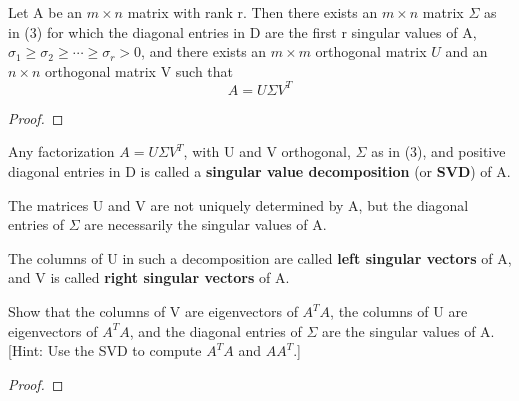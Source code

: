 \begin{theorem}
    Let A be an \(m \times n\) matrix with rank r. 
    Then there exists an \(m \times n\) matrix \(\Sigma\) as in (3) for which the diagonal entries in D are the first r singular values of A, \(\sigma_1 \geq \sigma_2 \geq \cdots \geq \sigma_r > 0\), 
    and there exists an \(m \times m\) orthogonal matrix \(U\) and an \(n \times n\) orthogonal matrix V such that
    \[
        A = U \Sigma V^T
    \]      
\end{theorem}
\begin{proof}
\end{proof}

\begin{definition}
    Any factorization \(A = U\Sigma V^T\), with U and V orthogonal, \(\Sigma \) as in (3), and positive diagonal entries in D is called a \textbf{singular value decomposition} (or \textbf{SVD}) of A. 
\end{definition}

The matrices U and V are not uniquely determined by A, but the diagonal entries of \(\Sigma\) are necessarily the singular values of A. 

The columns of U in such a decomposition are called \textbf{left singular vectors} of A, and V is called \textbf{right singular vectors} of A. 

\begin{problem}
    Show that the columns of V are eigenvectors of \(A^TA\), the columns of U are eigenvectors of \(A^TA\), and the diagonal entries of \(\Sigma\)  are the singular values of A.  
    [Hint: Use the SVD to compute \(A^TA\) and \(AA^T\).]
\end{problem}
\begin{proof}
\end{proof}
